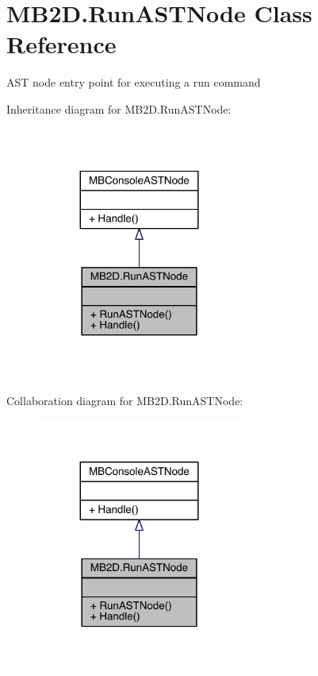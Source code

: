 \hypertarget{class_m_b2_d_1_1_run_a_s_t_node}{}\section{M\+B2\+D.\+Run\+A\+S\+T\+Node Class Reference}
\label{class_m_b2_d_1_1_run_a_s_t_node}


A\+ST node entry point for executing a run command  




Inheritance diagram for M\+B2\+D.\+Run\+A\+S\+T\+Node\+:\nopagebreak
\begin{figure}[H]
\begin{center}
\leavevmode
\includegraphics[width=191pt]{class_m_b2_d_1_1_run_a_s_t_node__inherit__graph}
\end{center}
\end{figure}


Collaboration diagram for M\+B2\+D.\+Run\+A\+S\+T\+Node\+:\nopagebreak
\begin{figure}[H]
\begin{center}
\leavevmode
\includegraphics[width=191pt]{class_m_b2_d_1_1_run_a_s_t_node__coll__graph}
\end{center}
\end{figure}

